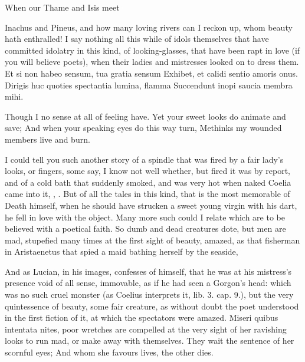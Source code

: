 When our Thame and Isis meet

Inachus and Pineus, and how many loving rivers can I reckon up, whom
beauty hath enthralled! I say nothing all this while of idols
themselves that have committed idolatry in this kind, of
looking-glasses, that have been rapt in love (if you will believe
poets), when their ladies and mistresses looked on to dress them.
Et si non habeo sensum, tua gratia sensum
Exhibet, et calidi sentio amoris onus.
Dirigis huc quoties spectantia lumina, flamma
Succendunt inopi saucia membra mihi.

Though I no sense at all of feeling have.
Yet your sweet looks do animate and save;
And when your speaking eyes do this way turn,
Methinks my wounded members live and burn.

I could tell you such another story of a spindle that was fired by a
fair lady's looks, or fingers, some say, I know not well whether,
but fired it was by report, and of a cold bath that suddenly smoked,
and was very hot when naked Coelia came into it, , \etc{}. But of all the tales in this kind, that
is the most memorable of Death himself, when he should have
strucken a sweet young virgin with his dart, he fell in love with the
object. Many more such could I relate which are to be believed with a
poetical faith. So dumb and dead creatures dote, but men are mad,
stupefied many times at the first sight of beauty, amazed, as
that fisherman in Aristaenetus that spied a maid bathing herself by the
seaside,

And as Lucian, in his images, confesses of himself, that he was
at his mistress's presence void of all sense, immovable, as if he had
seen a Gorgon's head: which was no such cruel monster (as Coelius
interprets it, lib. 3. cap. 9.), but the very quintessence of beauty,
some fair creature, as without doubt the poet understood in the first
fiction of it, at which the spectators were amazed. Miseri quibus
intentata nites, poor wretches are compelled at the very sight of her
ravishing looks to run mad, or make away with themselves.
They wait the sentence of her scornful eyes;
And whom she favours lives, the other dies.

